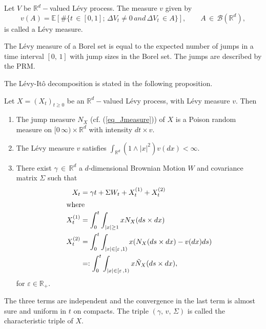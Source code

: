 \begin{theorem}
Let $V$ be  $\mathbb{R}^d-$valued L\'evy process. The measure $v$  given by 
\begin{equation}
    v(A) = \mathbb{E}[\# \{t \, \in [0, 1]; \, \Delta V_t \neq 0 \, and  \, \Delta V_t \, \in A \}], \qquad A \, \in \, \mathcal{B}(\mathbb{R}^d),
\end{equation}
is called a L\'evy measure.
\end{theorem}
\begin{interpretation}
The L\'evy measure of a Borel set is equal to the expected number of jumps in a time interval $[0,\, 1]$ with jump sizes in the Borel set. The jumps are described by the PRM.
\end{interpretation}
The L\'evy-It\^o decomposition is stated in the following proposition.
\begin{proposition} \label{levy_Ito_decop}
Let $X = (X_t)_{t\geq0}$ be an $\mathbb{R}^d-$valued L\'evy process, with L\'evy measure $v$. Then 
\begin{enumerate}
    \item The jump measure $N_X$ (cf. (\ref{eq_Jmeasure})) of $X$ is a Poison random measure on $[0 \, \infty) \times \mathbb{R}^d$ with intensity $dt \times v$.
    \item The L\'evy measure $v$ satisfies $\int_{\mathbb{R}^d} (1 \land |x|^2)  v(dx)< \infty$.
    \item There exist $\gamma \, \in \, \mathbb{R}^d$ a $d$-dimensional Brownian Motion $W$ and covariance matrix $\Sigma$ such that 
    \begin{align}
         X_t &= \gamma t + \Sigma W_t + X^{(1)}_t + X^{(2)}_t \label{eq_215} \\ 
         \intertext{where}
        X^{(1)}_t &= \int_0^t \int_{|x| \geq 1} x N_X (ds \times dx)  \label{eq_216} \\ 
        X^{(2)}_t &=  \int_0^t \int_{|x| \in [\varepsilon \,, 1)} x (N_X (ds \times dx) - v (dx)ds) \label{eq_217} \\ 
        &=:  \int_0^t \int_{|x| \in [\varepsilon \,, 1)} x \tilde{N}_X (ds \times dx), \label{eq_218}
     \end{align}
     for $\varepsilon \in \mathbb{R}_+ $.
\end{enumerate}
The three terms are independent and the convergence in the last term is almost sure and uniform in $t$ on compacts. The triple $( \gamma,\, v,\, \Sigma)$ is called the characteristic triple of $X$.
\end{proposition}
